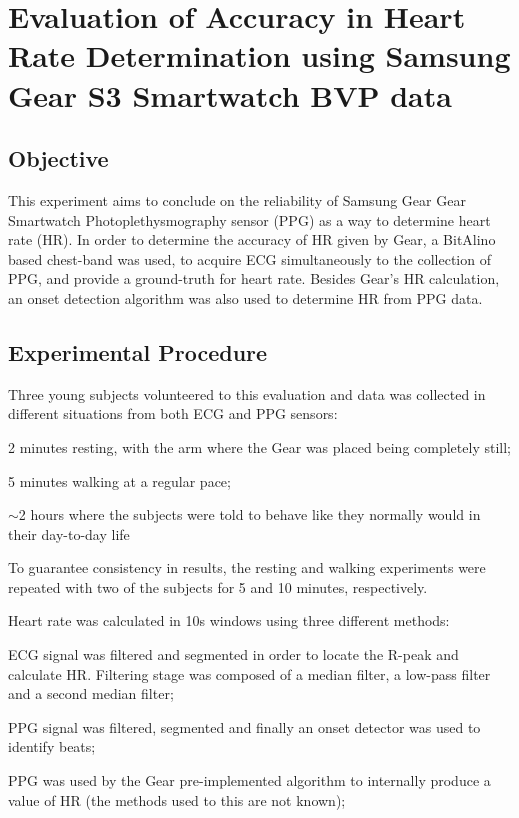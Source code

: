 
\chapter{Evaluation of Accuracy in Heart Rate Determination using Samsung Gear S3 Smartwatch BVP data}

\section{Objective}

This experiment aims to conclude on the reliability of Samsung Gear Gear Smartwatch Photoplethysmography sensor (PPG) as a way to determine heart rate (HR).
In order to determine the accuracy of HR given by Gear, a BitAlino based chest-band was used, to acquire ECG simultaneously to the collection of PPG, and provide a ground-truth for heart rate. Besides Gear's HR calculation, an onset detection algorithm was also used to determine HR from PPG data.

\section{Experimental Procedure}

Three young subjects volunteered to this evaluation and data was collected in different situations from both ECG and PPG sensors:
\begin{description}[labelindent=\parindent]
	\item[--] 2 minutes resting, with the arm where the Gear was placed being completely still;
	\item[--] 5 minutes walking at a regular pace;
	\item[--] \(\sim\)2 hours where the subjects were told to behave like they normally would in their day-to-day life
\end{description}

\noindent

To guarantee consistency in results, the resting and walking experiments were repeated with two of the subjects for 5 and 10 minutes, respectively.

Heart rate was calculated in 10s windows using three different methods:
	
\begin{description}[labelindent=\parindent]
	\item[--] ECG signal was filtered and segmented in order to locate the R-peak and calculate HR. Filtering stage was composed of a median filter, a low-pass filter and a second median filter;
	\item[--] PPG signal was filtered, segmented and finally an onset detector was used to identify beats;
	\item[--] PPG was used by the Gear pre-implemented algorithm to internally produce a value of HR (the methods used to this are not known);
\end{description}


